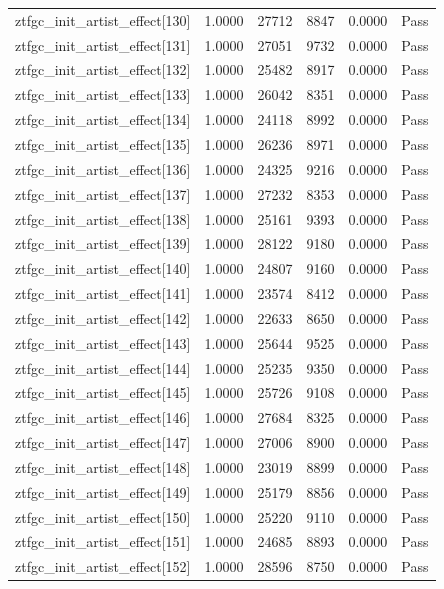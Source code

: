 \begin{table}[htbp]
\begin{tabular}{llrrll}
ztfgc\_init\_artist\_effect[130] & 1.0000 & 27712 & 8847 & 0.0000 & Pass \\
ztfgc\_init\_artist\_effect[131] & 1.0000 & 27051 & 9732 & 0.0000 & Pass \\
ztfgc\_init\_artist\_effect[132] & 1.0000 & 25482 & 8917 & 0.0000 & Pass \\
ztfgc\_init\_artist\_effect[133] & 1.0000 & 26042 & 8351 & 0.0000 & Pass \\
ztfgc\_init\_artist\_effect[134] & 1.0000 & 24118 & 8992 & 0.0000 & Pass \\
ztfgc\_init\_artist\_effect[135] & 1.0000 & 26236 & 8971 & 0.0000 & Pass \\
ztfgc\_init\_artist\_effect[136] & 1.0000 & 24325 & 9216 & 0.0000 & Pass \\
ztfgc\_init\_artist\_effect[137] & 1.0000 & 27232 & 8353 & 0.0000 & Pass \\
ztfgc\_init\_artist\_effect[138] & 1.0000 & 25161 & 9393 & 0.0000 & Pass \\
ztfgc\_init\_artist\_effect[139] & 1.0000 & 28122 & 9180 & 0.0000 & Pass \\
ztfgc\_init\_artist\_effect[140] & 1.0000 & 24807 & 9160 & 0.0000 & Pass \\
ztfgc\_init\_artist\_effect[141] & 1.0000 & 23574 & 8412 & 0.0000 & Pass \\
ztfgc\_init\_artist\_effect[142] & 1.0000 & 22633 & 8650 & 0.0000 & Pass \\
ztfgc\_init\_artist\_effect[143] & 1.0000 & 25644 & 9525 & 0.0000 & Pass \\
ztfgc\_init\_artist\_effect[144] & 1.0000 & 25235 & 9350 & 0.0000 & Pass \\
ztfgc\_init\_artist\_effect[145] & 1.0000 & 25726 & 9108 & 0.0000 & Pass \\
ztfgc\_init\_artist\_effect[146] & 1.0000 & 27684 & 8325 & 0.0000 & Pass \\
ztfgc\_init\_artist\_effect[147] & 1.0000 & 27006 & 8900 & 0.0000 & Pass \\
ztfgc\_init\_artist\_effect[148] & 1.0000 & 23019 & 8899 & 0.0000 & Pass \\
ztfgc\_init\_artist\_effect[149] & 1.0000 & 25179 & 8856 & 0.0000 & Pass \\
ztfgc\_init\_artist\_effect[150] & 1.0000 & 25220 & 9110 & 0.0000 & Pass \\
ztfgc\_init\_artist\_effect[151] & 1.0000 & 24685 & 8893 & 0.0000 & Pass \\
ztfgc\_init\_artist\_effect[152] & 1.0000 & 28596 & 8750 & 0.0000 & Pass \\

\end{tabular}
\end{table}
